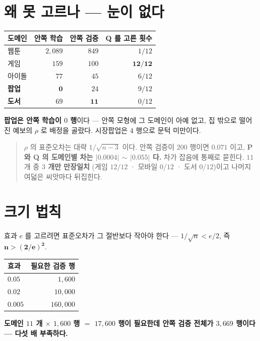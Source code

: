 \documentclass[11pt]{article}
\begin{document}
\section{왜 못 고르나 --- 눈이 없다}

\begin{center}
\begin{tabular}{lrrr}
\hline
도메인 & 안쪽 학습 & 안쪽 검증 & Q 를 고른 횟수 \\
\hline
웹툰 & $2{,}089$ & $849$ & $1/12$ \\
게임 & $159$ & $100$ & $\mathbf{12/12}$ \\
아이돌 & $77$ & $45$ & $6/12$ \\
\textbf{팝업} & $\mathbf{0}$ & $24$ & $9/12$ \\
\textbf{도서} & $69$ & $\mathbf{11}$ & $0/12$ \\
\hline
\end{tabular}
\end{center}

\textbf{팝업은 안쪽 학습이 $0$ 행}이다 --- 안쪽 모형에 그 도메인이 아예 없고,
집 밖으로 떨어진 예보의 $\rho$ 로 배정을 골랐다. 시장팝업은 $4$ 행으로
문턱 미만이다.

\begin{quote}
$\rho$ 의 표준오차는 대략 $1/\sqrt{n-3}$ 이다. 안쪽 검증이 $200$ 행이면
$0.071$ 이고, \textbf{P 와 Q 의 도메인별 차는 $|0.0004|$ $\sim$ $|0.055|$
다.} 차가 잡음에 통째로 묻힌다. $11$ 개 중 \textbf{$3$ 개만 만장일치}
(게임 $12/12$ · 모바일 $0/12$ · 도서 $0/12$)이고 나머지 여덟은 씨앗마다
뒤집힌다.
\end{quote}

\section{크기 법칙}

효과 $e$ 를 고르려면 표준오차가 그 절반보다 작아야 한다 ---
$1/\sqrt{n} < e/2$, 즉 $\mathbf{n > (2/e)^2}$.

\begin{center}
\begin{tabular}{lr}
\hline
효과 & 필요한 검증 행 \\
\hline
$0.05$ & $1{,}600$ \\
$0.02$ & $10{,}000$ \\
$0.005$ & $160{,}000$ \\
\hline
\end{tabular}
\end{center}

\textbf{도메인 $11$ 개 $\times$ $1{,}600$ 행 $=$ $17{,}600$ 행이 필요한데
안쪽 검증 전체가 $3{,}669$ 행이다 --- 다섯 배 부족하다.}
\end{document}

